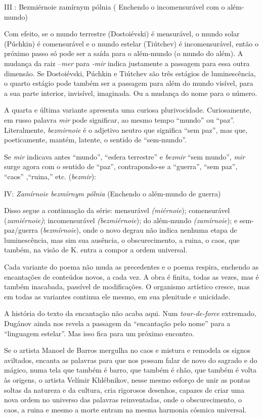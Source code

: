 III : Bezmiérnoie zamírnym pólnia ( Enchendo o incomensurável com o
além-mundo)

Com efeito, se o mundo terrestre (Dostoiévski) é mensurável, o mundo
solar (Púchkin) é comensurável e o mundo estelar (Tiútchev) é
incomensurável, então o próximo passo só pode ser a saída para o
além-mundo (o mundo do além). A mudança da raiz --\emph{mer} para
\emph{-mir} indica justamente a passagem para essa outra dimensão. Se
Dostoiévski, Púchkin e Tiútchev são três estágios de luminescência, o
quarto estágio pode também ser a passagem para além do mundo visível,
para a sua parte interior, invisível, imaginada. Ou a mudança do nome
para o número.

A quarta e última variante apresenta uma curiosa plurivocidade.
Curiosamente, em russo palavra \emph{mir} pode significar, ao mesmo
tempo ``mundo'' ou ``paz''. Literalmente, \emph{bezmirnoie} é o adjetivo
neutro que significa ``sem paz'', mas que, poeticamente, mantém,
latente, o sentido de ``sem-mundo''.

Se \emph{mir} indicava antes ``mundo'', ``esfera terrestre'' e
\emph{bezmir} ``sem mundo'', \emph{mir} surge agora com o sentido de
``paz'', contrapondo-se a ``guerra'', ``sem paz'', ``caos'' ,``ruina,''
etc. (\emph{bezmir}):

IV: \emph{Zamírnoie bezmírnym pólnia} (Enchendo o além-mundo de guerra)

Disso segue a continuação da série: mensurável \emph{(miérnoie});
comensurável (\emph{zamiérnoie)}; incomensurável \emph{(bezmiérnoie});
do além-mundo \emph{(zamírnoie}); e sem-paz/guerra (\emph{bezmírnoie}),
onde o novo degrau não indica nenhuma etapa de luminescência, mas sim
sua ausência, o obscurecimento, a ruina, o caos, que também, na visão de
K. entra a compor a ordem universal.

Cada variante do poema não muda as precedentes e o poema respira,
enchendo as encantações de conteúdos novos, a cada vez. A obra é finita,
todas as vezes, mas é também inacabada, passível de modificações. O
organismo artístico cresce, mas em todas as variantes continua ele
mesmo, em sua plenitude e unicidade.

A história do texto da encantação não acaba aqui. Num
\emph{tour-de-force} extremado, Dugánov ainda nos revela a passagem da
``encantação pelo nome'' para a ``linguagem estelar''. Mas isso fica
para um próximo encontro.

Se o artista Manoel de Barros mergulha no caos e mistura e remodela os
signos aviltados, encanta as palavras para que nos possam falar de novo
do sagrado e do mágico, numa tela que também é barro, que também é chão,
que também é volta às origens, o artista Velímir Khlébnikov, nesse mesmo
esforço de unir as pontas soltas da natureza e da cultura, cria
rigorosos desenhos, capazes de criar uma nova ordem no universo das
palavras reinventadas, onde o obscurecimento, o caos, a ruina e mesmo a
morte entram na mesma harmonia cósmica universal.

